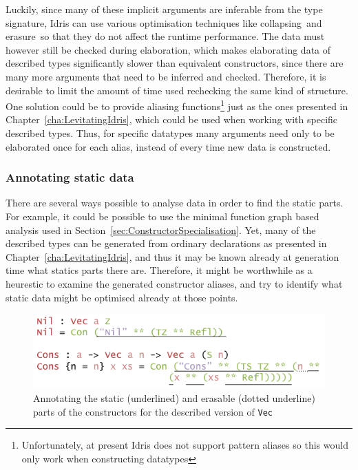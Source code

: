 \documentclass{ituthesis}
\newcommand{\tttype}[1]{\textcolor{type-color}{\texttt{#1}}}
\theoremstyle{break}
\begin{document}
Luckily, since many of these implicit arguments are inferable from the type signature, Idris can use various optimisation techniques like collapsing\,\autocite{Brady04inductivefamilies} and erasure\,\autocite{tejiscak2014erasure} so that they do not affect the runtime performance.
The data must however still be checked during elaboration, which makes elaborating data of described types significantly slower than equivalent constructors, since there are many more arguments that need to be inferred and checked.
Therefore, it is desirable to limit the amount of time used rechecking the same kind of structure.
One solution could be to provide aliasing functions\footnote{Unfortunately, at present Idris does not support pattern aliases so this would only work when constructing datatypes}
just as the ones presented in Chapter~\ref{cha:LevitatingIdris}, which could be used when working with specific described types.
Thus, for specific datatypes many arguments need only to be elaborated once for each alias, instead of every time new data is constructed.

\subsubsection{Annotating static data}
\label{ssub:Annotating static data}
There are several ways possible to analyse data in order to find the static parts.
For example, it could be possible to use the minimal function graph based analysis used in Section~\ref{sec:ConstructorSpecialisation}.
Yet, many of the described types can be generated from ordinary declarations as presented in Chapter~\ref{cha:LevitatingIdris}, and thus it may be known already at generation time what statics parts there are.
Therefore, it might be worthwhile as a heurestic to examine the generated constructor aliases, and try to identify what static data might be optimised already at those points.

\begin{figure}[ht]
\begin{center}
    \includegraphics[scale=0.5]{Figures/VectorSynthesisedConstructorsAnalysis.png}
\end{center}
\caption{Annotating the static (underlined) and erasable (dotted underline) parts of the constructors for the described version of \tttype{Vec}}
\label{fig:btvecctors}
\end{figure}
\end{document}
